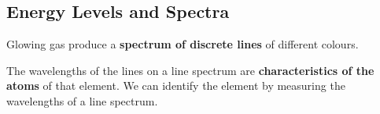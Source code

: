 \subsection{Energy Levels and Spectra}

Glowing gas produce a \textbf{spectrum of discrete lines} of different colours.

The wavelengths of the lines on a line spectrum are \textbf{characteristics of the atoms} of that element. We can identify the element by measuring the wavelengths of a line spectrum.
